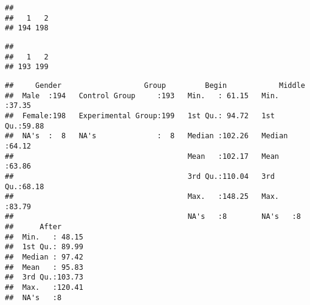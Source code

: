\documentclass[
]{article}
\newenvironment{Shaded}{\begin{snugshade}}{\end{snugshade}}
\newcommand{\DataTypeTok}[1]{\textcolor[rgb]{0.13,0.29,0.53}{#1}}
\newcommand{\DecValTok}[1]{\textcolor[rgb]{0.00,0.00,0.81}{#1}}
\newcommand{\KeywordTok}[1]{\textcolor[rgb]{0.13,0.29,0.53}{\textbf{#1}}}
\newcommand{\NormalTok}[1]{#1}
\newcommand{\OperatorTok}[1]{\textcolor[rgb]{0.81,0.36,0.00}{\textbf{#1}}}
\newcommand{\StringTok}[1]{\textcolor[rgb]{0.31,0.60,0.02}{#1}}
\begin{document}
\begin{verbatim}
## 
##   1   2 
## 194 198
\end{verbatim}

\begin{Shaded}
\end{Shaded}

\begin{verbatim}
## 
##   1   2 
## 193 199
\end{verbatim}

\begin{Shaded}
\end{Shaded}

\begin{verbatim}
##     Gender                   Group         Begin            Middle     
##  Male  :194   Control Group     :193   Min.   : 61.15   Min.   :37.35  
##  Female:198   Experimental Group:199   1st Qu.: 94.72   1st Qu.:59.88  
##  NA's  :  8   NA's              :  8   Median :102.26   Median :64.12  
##                                        Mean   :102.17   Mean   :63.86  
##                                        3rd Qu.:110.04   3rd Qu.:68.18  
##                                        Max.   :148.25   Max.   :83.79  
##                                        NA's   :8        NA's   :8      
##      After       
##  Min.   : 48.15  
##  1st Qu.: 89.99  
##  Median : 97.42  
##  Mean   : 95.83  
##  3rd Qu.:103.73  
##  Max.   :120.41  
##  NA's   :8
\end{verbatim}
\end{document}

